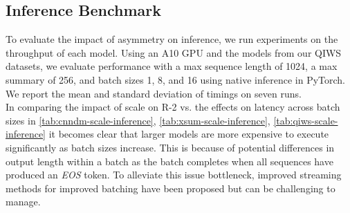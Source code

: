 \subsection{Inference Benchmark}
To evaluate the impact of asymmetry on inference, we run experiments on the throughput of each model. Using an A10 GPU and the models from our QIWS datasets, we evaluate performance with a max sequence length of 1024, a max summary of 256, and batch sizes 1, 8, and 16 using native inference in PyTorch. We report the mean and standard deviation of timings on seven runs. \\
In comparing the impact of scale on R-2 vs. the effects on latency across batch sizes in \ref{tab:cnndm-scale-inference}, \ref{tab:xsum-scale-inference}, \ref{tab:qiws-scale-inference} it becomes clear that larger models are more expensive to execute significantly as batch sizes increase. This is because of potential differences in output length within a batch as the batch completes when all sequences have produced an \textit{EOS} token. To alleviate this issue bottleneck, improved streaming methods for improved batching have been proposed \cite{Yang2020ASA} but can be challenging to manage. 